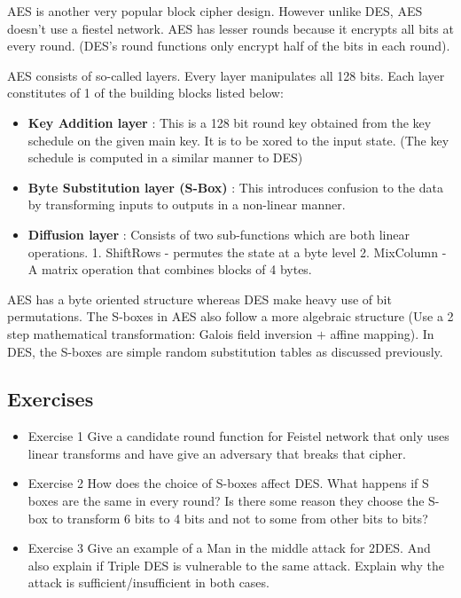 AES is another very popular block cipher design. However unlike DES, AES doesn't use a fiestel network. AES has lesser rounds because it encrypts all  bits at every round. (DES's round functions only encrypt half of the bits in each round). 

AES consists of so-called layers. Every layer manipulates all 128 bits. Each layer constitutes of 1 of the building blocks listed below: \newline

\begin{itemize}
\item \textbf{Key Addition layer} : This is a 128 bit round key obtained from the key schedule on the given main key. It is to be xored to the input state. (The key schedule is computed in a similar manner to DES)
\item \textbf{Byte Substitution layer (S-Box)} : This introduces confusion to the data by transforming inputs to outputs in a non-linear manner.
\item \textbf{Diffusion layer} : Consists of two sub-functions which are both linear operations. 1. ShiftRows - permutes the state at a byte level 2. MixColumn - A matrix operation that combines blocks of 4 bytes.
\end{itemize}

AES has a byte oriented structure whereas DES make heavy use of bit permutations. The S-boxes in AES also follow a more algebraic structure (Use a 2 step mathematical transformation: Galois field inversion $+$ affine mapping). In DES, the S-boxes are simple random substitution tables as discussed previously. \newline

\subsection{Exercises}
\begin{itemize}
\item {Exercise 1} Give a candidate round function for Feistel network that only uses linear transforms and have give an adversary that breaks that cipher.
\item {Exercise 2} How does the choice of S-boxes affect DES. What happens if S boxes are the same in every round? Is there some reason they choose the S-box to transform 6 bits to 4 bits and not to some from other bits to bits?
\item {Exercise 3} Give an example of a Man in the middle attack for 2DES. And also explain if Triple DES is vulnerable to the same attack. Explain why the attack is sufficient/insufficient in both cases.
\end{itemize}



